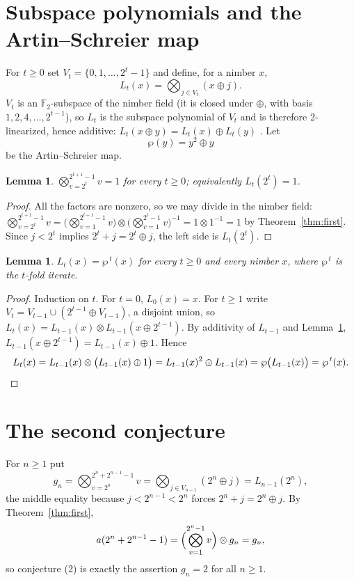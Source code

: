 \documentclass[11pt,a4paper]{article}
\theoremstyle{plain}
\newtheorem{lemma}[theorem]{Lemma}
\theoremstyle{definition}
\begin{document}
\section{Subspace polynomials and the Artin--Schreier map}

For $t\ge0$ set $V_{t}=\{0,1,\dots,2^{t}-1\}$ and define, for a nimber $x$,
\[
  L_{t}(x)=\bigotimes_{j\in V_{t}}(x\oplus j).
\]
$V_{t}$ is an $\mathbb{F}_{2}$-subspace of the nimber field (it is closed under $\oplus$,
with basis $1,2,4,\dots,2^{t-1}$), so $L_{t}$ is the subspace polynomial of $V_{t}$ and is
therefore 2-linearized, hence additive: $L_{t}(x\oplus y)=L_{t}(x)\oplus L_{t}(y)$
\cite[Thm.~3.52]{ln}. Let
\[
  \wp(y)=y^{2}\oplus y
\]
be the Artin--Schreier map.

\begin{lemma}\label{lem:one}
$\bigotimes_{v=2^{t}}^{2^{t+1}-1}v=1$ for every $t\ge0$; equivalently $L_{t}(2^{t})=1$.
\end{lemma}

\begin{proof}
All the factors are nonzero, so we may divide in the nimber field:
$\bigotimes_{v=2^{t}}^{2^{t+1}-1}v
=\bigl(\bigotimes_{v=1}^{2^{t+1}-1}v\bigr)\otimes
 \bigl(\bigotimes_{v=1}^{2^{t}-1}v\bigr)^{-1}=1\otimes1^{-1}=1$ by
Theorem~\ref{thm:first}. Since $j<2^{t}$ implies $2^{t}+j=2^{t}\oplus j$, the left side is
$L_{t}(2^{t})$.
\end{proof}

\begin{lemma}\label{lem:iter}
$L_{t}(x)=\wp^{\,t}(x)$ for every $t\ge0$ and every nimber $x$, where $\wp^{\,t}$ is the
$t$-fold iterate.
\end{lemma}

\begin{proof}
Induction on $t$. For $t=0$, $L_{0}(x)=x$. For $t\ge1$ write
$V_{t}=V_{t-1}\cup(2^{t-1}\oplus V_{t-1})$, a disjoint union, so
$L_{t}(x)=L_{t-1}(x)\otimes L_{t-1}(x\oplus2^{t-1})$. By additivity of $L_{t-1}$ and
Lemma~\ref{lem:one}, $L_{t-1}(x\oplus2^{t-1})=L_{t-1}(x)\oplus1$. Hence
\[
  L_{t}(x)=L_{t-1}(x)\otimes\bigl(L_{t-1}(x)\oplus1\bigr)
  =L_{t-1}(x)^{2}\oplus L_{t-1}(x)=\wp\bigl(L_{t-1}(x)\bigr)=\wp^{\,t}(x).\qedhere
\]
\end{proof}

\section{The second conjecture}

For $n\ge1$ put
\[
  g_{n}=\bigotimes_{v=2^{n}}^{2^{n}+2^{n-1}-1}v
       =\bigotimes_{j\in V_{n-1}}(2^{n}\oplus j)=L_{n-1}(2^{n}),
\]
the middle equality because $j<2^{n-1}<2^{n}$ forces $2^{n}+j=2^{n}\oplus j$. By
Theorem~\ref{thm:first},
\begin{equation}\label{eq:reduce}
  a(2^{n}+2^{n-1}-1)=\Bigl(\bigotimes_{v=1}^{2^{n}-1}v\Bigr)\otimes g_{n}=g_{n},
\end{equation}
so conjecture (2) is exactly the assertion $g_{n}=2$ for all $n\ge1$.
\end{document}
